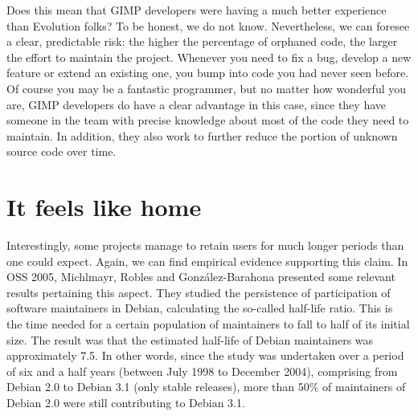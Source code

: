 Does this mean that GIMP developers were having a much better experience than
Evolution folks? To be honest, we do not know. Nevertheless, we can foresee a
clear, predictable risk: the higher the percentage of orphaned code, the larger
the effort to maintain the project. Whenever you need to fix a bug, develop a
new feature or extend an existing one, you bump into code you had never seen
before. Of course you may be a fantastic programmer, but no matter how wonderful
you are, GIMP developers do have a clear advantage in this case, since they have
someone in the team with precise knowledge about most of the code they need to
maintain. In addition, they also work to further reduce the portion of unknown
source code over time.

\section*{It feels like home}

Interestingly, some projects manage to retain users for much longer periods than
one could expect. Again, we can find empirical evidence supporting this claim.
In OSS 2005, Michlmayr, Robles and González-Barahona presented some relevant
results pertaining this aspect. They studied the persistence of participation of
software maintainers in Debian, calculating the so-called half-life ratio. This
is the time needed for a certain population of maintainers to fall to half of
its initial size. The result was that the estimated half-life of Debian
maintainers was approximately 7.5. In other words, since the study
was undertaken over a period of six and a half years (between July 1998 to
December 2004), comprising from Debian 2.0 to Debian 3.1 (only stable releases),
more than 50\% of maintainers of Debian 2.0 were still contributing to Debian
3.1.

